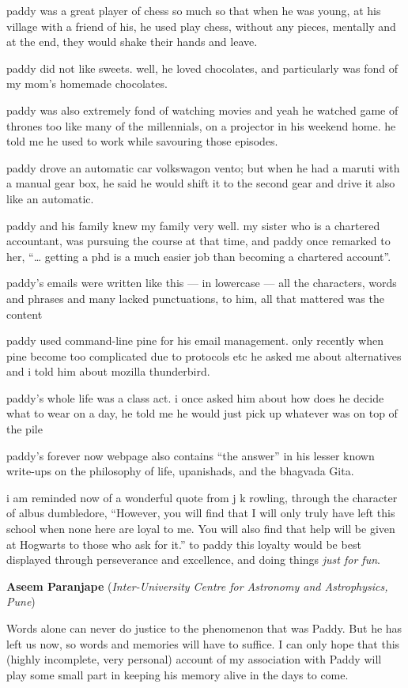 \documentclass[prd, preprint, longbibliography, 11pt]{revtex4-1}
\begin{document}
paddy was a great player of chess so much so that when he was young, at his village with a friend of his,  he used play chess, without any pieces, mentally and at the end, they would shake their hands and leave.

paddy did not like sweets. well, he loved chocolates, and particularly was fond of my mom’s homemade chocolates.

paddy was also extremely fond of watching movies and yeah he watched game of thrones too like many of the millennials, on a projector in his weekend home. he told me he used to work while savouring those episodes.

paddy drove an automatic car volkswagon vento; but when he had a maruti with a manual gear box, he said he would shift it to the second gear and drive it also like an automatic. 

paddy and his family knew my family very well. my sister who is a chartered accountant, was pursuing the course at that time, and paddy once remarked to her, “… getting a phd is  a much easier job than becoming a chartered account”. 

paddy’s emails were written like this — in lowercase — all the characters, words and phrases and many lacked punctuations, to him, all that mattered was the content

paddy used command-line pine for his email management. only recently when pine become too complicated due to protocols etc he asked me about alternatives and i told him about mozilla thunderbird.

paddy’s whole life was a class act. i once asked him about how does he decide what to wear on a day, he told me he would just pick up whatever was on top of the pile

paddy’s forever now webpage also contains “the answer” in his lesser known write-ups on the philosophy of life, upanishads, and the bhagvada Gita. 

i am reminded now of a wonderful quote from j k rowling, through the character of albus dumbledore, “However, you will find that I will only truly have left this school when none here are loyal to me. You will also find that help will be given at Hogwarts to those who ask for it.”  to paddy this loyalty would be best displayed through perseverance and excellence, and doing things {\it just for fun}. 


\bigskip

\bigskip

\centerline{{\bf Aseem Paranjape} ({\it Inter-University Centre for Astronomy and Astrophysics, Pune})}
\medskip
\noindent Words alone can never do justice to the phenomenon that was Paddy. But he has left us now, so words and memories will have to suffice. I can only hope that this (highly incomplete, very personal) account of my association with Paddy will play some small part in keeping his memory alive in the days to come.
\end{document}
